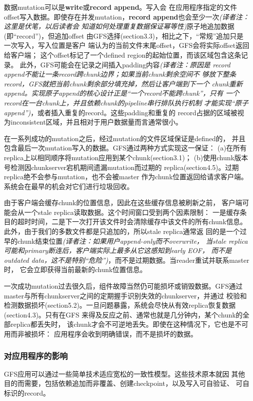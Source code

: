 数据mutation可以是\textbf{write}或\textbf{record append}。写入会
在应用程序指定的文件offset写入数据。即使存在并发mutation，\textbf
{record append}也会至少一次\emph{(译者注：这里是伏笔，以后读者会
知道如何处理重复数据保证幂等性)}原子地追加数据(即“record”)，但追加offset
由GFS选择(section3.3)，相比之下，“常规”追加只是一次写入，写入位置是客户
端认为的当前文件末尾offset，GFS会将实际offset返回给客户端；
这个offset标记了一个defined region的起始位置，而该区域包含这条记录。
此外，GFS可能会在记录之间插入padding内容\emph{(译者注：原因是
record append不能让一条record跨chunk边界；如果当前chunk剩余空间不
够放下整条record，GFS就把当前chunk剩余部分填充掉，然后让客户端到下一个
chunk重新append。实现原子append的核心设计正是“一个record不能跨chunk”，只有
一个record在一台chunk上，并且依赖chunk的pipeline串行排队执行机制
才能实现“原子append”)}，或者插入重复的record。这些padding和重复的
record占据的区域被视为inconsistent区域，并且相对于用户数据量而言通常很小。

在一系列成功的mutation之后，经过mutation的文件区域保证是defined的，
并且包含最后一次mutation写入的数据。GFS通过两种方式实现这一保证：
(a)在所有replica上以相同顺序将mutation应用到某个chunk(section3.1)；
(b)使用chunk版本号检测因chunkserver宕机期间遗漏mutation而过期的
replica(section4.5)。过期replica绝不会参与mutation，也不会被master
作为chunk位置返回给请求客户端。系统会在最早的机会对它们进行垃圾回收。

由于客户端会缓存chunk的位置信息，因此在这些缓存信息被刷新之前，
客户端可能会从一个stale replica读取数据。这个时间窗口受到两个因素限制：
一是缓存条目的超时时间，二是下一次打开该文件时会清除缓存中该文件的所有chunk信息。
此外，由于我们的多数文件都是只追加的，所以stale replica通常返
回的是一个过早的chunk结束位置\emph{(译者注：如果用户append-only而不overwrite，
当stale replica可能和primary断连后，客户端实际上最多从它这感知到early EOF，
而不是outdated data，这不是特别“危险”)}，而不是过期数据。当reader重试并联系master时，
它会立即获得当前最新的chunk位置信息。

一次成功mutation过去很久后，组件故障当然仍可能损坏或销毁数据。GFS通过
master与所有chunkserver之间的定期握手识别失效的chunkserver，并通过
校验和检测数据损坏(section5.2)。一旦问题暴露，系统会尽快从有效replica恢复数据(section4.3)。只有在GFS
来得及反应之前、通常也就是几分钟内，某个chunk的全部replica都丢失时，
该chunk才会不可逆地丢失。即使在这种情况下，它也是不可用而非被损坏：
应用程序会收到明确错误，而不是损坏的数据。

\subsubsection{对应用程序的影响}
GFS应用可以通过一些简单技术适应宽松的一致性模型。这些技术原本就因
其他目的而需要，包括依赖追加而非覆盖、创建checkpoint，以及写入可自验证、
可自标识的record。

